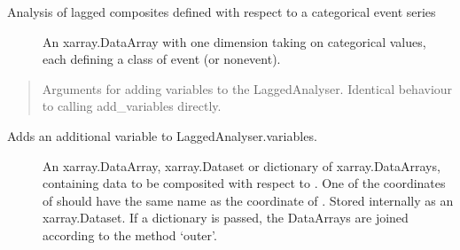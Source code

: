 \documentclass[letterpaper,10pt,english]{sphinxmanual}
\begin{document}
\begin{fulllineitems}
\label{\detokenize{docs/composites:composites.LaggedAnalyser}}
\pysigstartsignatures
{}
\pysigstopsignatures
\sphinxAtStartPar
Analysis of lagged composites defined with respect to a categorical event series

\sphinxAtStartPar
{}
\begin{description}
\item[{}] \leavevmode
\sphinxAtStartPar
An xarray.DataArray with one dimension taking on categorical values, each defining a class of event (or non\sphinxhyphen{}event).

\end{description}

\sphinxAtStartPar
{}

\sphinxAtStartPar
{}
\begin{quote}

\sphinxAtStartPar
Arguments for adding variables to the LaggedAnalyser. Identical behaviour to calling add\_variables directly.
\end{quote}

\begin{fulllineitems}
\label{\detokenize{docs/composites:composites.LaggedAnalyser.add_variable}}
\pysigstartsignatures
{}
\pysigstopsignatures
\sphinxAtStartPar
Adds an additional variable to LaggedAnalyser.variables.

\sphinxAtStartPar
{}
\begin{description}
\item[{ }] \leavevmode
\sphinxAtStartPar
An xarray.DataArray, xarray.Dataset or dictionary of xarray.DataArrays, containing data to be composited with respect to . One of the coordinates of  should have the same name as the coordinate of . Stored internally as an xarray.Dataset. If a dictionary is passed, the DataArrays are joined according to the method ‘outer’.


\end{description}
\end{fulllineitems}
\end{fulllineitems}
\end{document}
